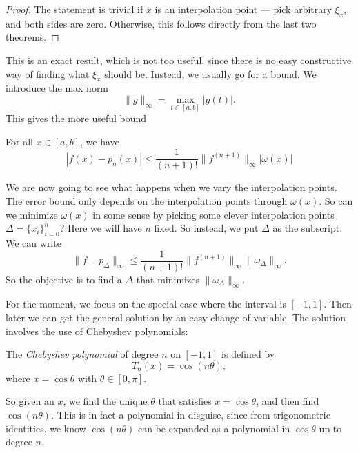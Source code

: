 \documentclass[a4paper]{article}
\begin{document}
\begin{proof}
  The statement is trivial if $x$ is an interpolation point --- pick arbitrary $\xi_x$, and both sides are zero. Otherwise, this follows directly from the last two theorems.
\end{proof}

This is an exact result, which is not too useful, since there is no easy constructive way of finding what $\xi_x$ should be. Instead, we usually go for a bound. We introduce the max norm
\[
  \|g\|_{\infty} = \max_{t \in [a, b]} |g(t)|.
\]
This gives the more useful bound
\begin{prop}
  For all $x \in [a, b]$, we have
  \[
    |f(x) - p_n(x)| \leq \frac{1}{(n + 1)!} \|f^{(n + 1)}\|_{\infty} |\omega(x)|
  \]
\end{prop}

We are now going to see what happens when we vary the interpolation points. The error bound only depends on the interpolation points through $\omega(x)$. So can we minimize $\omega(x)$ in some sense by picking some clever interpolation points $\Delta = \{x_i\}_{i = 0}^n$? Here we will have $n$ fixed. So instead, we put $\Delta$ as the subscript. We can write
\[
  \|f - p_{\Delta}\|_{\infty} \leq \frac{1}{(n + 1)!} \|f^{(n + 1)}\|_{\infty} \|\omega_{\Delta}\|_{\infty}.
\]
So the objective is to find a $\Delta$ that minimizes $\|\omega_{\Delta}\|_{\infty}$.

For the moment, we focus on the special case where the interval is $[-1, 1]$. Then later we can get the general solution by an easy change of variable. The solution involves the use of Chebyshev polynomials:
\begin{defi}
  The \emph{Chebyshev polynomial} of degree $n$ on $[-1, 1]$ is defined by
  \[
    T_n(x) = \cos(n \theta),
  \]
  where $x = \cos \theta$ with $\theta\in [0, \pi]$.
\end{defi}
So given an $x$, we find the unique $\theta$ that satisfies $x = \cos \theta$, and then find $\cos (n \theta)$. This is in fact a polynomial in disguise, since from trigonometric identities, we know $\cos (n\theta)$ can be expanded as a polynomial in $\cos \theta$ up to degree $n$.
\end{document}
